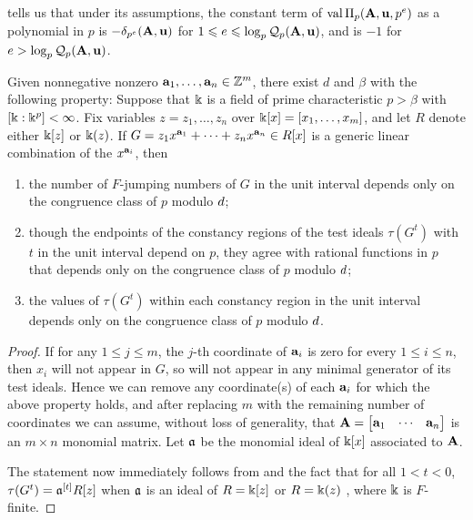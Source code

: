 \documentclass{amsart}
\begin{document}
\begin{remark}
	 tells us that under its assumptions, the constant term of $\operatorname{val} \Pi_p(\mathbf{A},\mathbf{u},p^e)$ as a polynomial in $p$ is $- \delta_{p^e}(\mathbf{A},\mathbf{u})$ for
	$1 \leqslant e \leqslant \log_p \mathcal{Q}_p(\mathbf{A},\mathbf{u})$, and is $-1$ for $e > \log_p \mathcal{Q}_p(\mathbf{A},\mathbf{u})$.
\end{remark}

\newpage

\begin{theorem}
	\label{generic-test-ideals-main: T}
Given nonnegative nonzero $\mathbf{a}_1, \ldots, \mathbf{a}_n \in \mathbb{Z}^m$, there exist $d$ and $\beta$ with the following property:  
Suppose that $\Bbbk$ is a field of prime characteristic $p > \beta$ with $[\Bbbk:\Bbbk^p] < \infty$.  
Fix variables $z = z_1, \ldots, z_n$ over $\Bbbk[x] = [x_1, \ldots, x_m]$, and let $R$ denote either $\Bbbk[z]$ or $\Bbbk(z)$. 
If $G = z_1 x^{\mathbf{a}_1} + \cdots + z_n x^{\mathbf{a}_n} \in R[x]$ is a generic linear combination of the $x^{\mathbf{a}_i}$, then
\begin{enumerate}[$(1)$]
		\item the number of $F$-jumping numbers of $G$ in the unit interval depends only on the congruence class of $p$ modulo $d$\textup;
		\item though the endpoints of the constancy regions of the test ideals $\tau(G^t)$ with $t$ in the unit interval 
		depend on $p$, they agree with rational functions in $p$ that depends only on the congruence class of $p$ modulo $d$\textup;
		\item the values of $\tau(G^t)$ within each constancy region in the unit interval depends only on the congruence class of $p$ modulo $d$.
	\end{enumerate}	
\end{theorem}

\begin{proof}
If for any $1 \leq j \leq m$, the $j$-th coordinate of $\mathbf{a}_i$ is zero for every $1 \leq i \leq n$, then $x_i$ will not appear in $G$, so will not appear in any minimal generator of its test ideals.  Hence we can remove any coordinate(s) of each $\mathbf{a}_i$ for which the above property holds, and after replacing $m$ with the remaining number of coordinates we can assume, without loss of generality, that $\mathbf{A} = \begin{bmatrix} \mathbf{a}_1 & \cdots & \mathbf{a}_n \end{bmatrix}$ is an $m \times n$ monomial matrix.  Let $\mathfrak{a}$ be the monomial ideal of $\Bbbk[x]$ associated to $\mathbf{A}$. 

The statement now immediately follows from   and 
the fact that for all $1 < t < 0$, $\tau(G^t) = \mathfrak{a}^{[t]} R[z]$ when $\mathfrak{a}$ is an ideal of 
$R = \Bbbk[z]$
\cite[Theorem 5.3]{hernandez+etal.frobenius_powers} or $R = \Bbbk(z)$ \cite[Corollary 5.7]{hernandez+etal.frobenius_powers}, where $\Bbbk$ is $F$-finite. 
\end{proof}	
	
\end{document}
